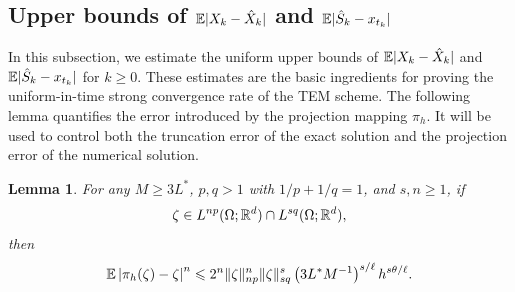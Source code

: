 \documentclass[aap]{imsart}
\theoremstyle{plain}
\newtheorem{lemma}[theorem]{Lemma}
\theoremstyle{definition}
\begin{document}
\subsection{Upper bounds of $\mathbb{E}|X_{k}-\hat{X}_{k}|$ and $\mathbb{E} |\hat{S}_{k}-x_{t_{k}}|$}
In this subsection, we estimate the uniform upper bounds of
\(\mathbb{E} |X_k-\hat X_k|\) and \(\mathbb{E}|\hat S_k-x_{t_k}|\) for \(k\geqslant0\).
These estimates are the basic ingredients for proving the uniform-in-time
strong convergence rate of the TEM scheme. The following lemma quantifies the error introduced by the projection mapping
\(\pi_h\). It will be used to control both the truncation error of the exact
solution and the projection error of the numerical solution.
\begin{lemma}\label{Le4}
	For any \(M\geqslant 3L^*\), \(p,q>1\) with \(1/p+1/q=1\), and
	\(s,n\geqslant1\), if
	\[
	\zeta\in L^{np}(\Omega;\mathbb{R}^d)\cap L^{sq}(\Omega;\mathbb{R}^d),
	\]
	then
	\[
	\mathbb{E} \left|\pi_h(\zeta)-\zeta\right|^n
	\leqslant
	2^n\|\zeta\|^n_{np}\|\zeta\|^s_{sq}
	\left(3L^*M^{-1}\right)^{s/\ell}h^{s\theta/\ell}.
	\]
\end{lemma}
\end{document}
